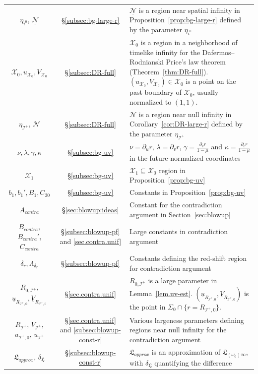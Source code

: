 \documentclass[10pt, reqno]{amsart}
\theoremstyle{definition}
\theoremstyle{remark}
\theoremstyle{conjecture}
\numberwithin{equation}{section}
\newcommand{\set}[1]{\{#1\}}
\newcommand{\rd}{\partial}
\newcommand{\0}{\emptyset}
\newcommand{\gmm}{\gamma}
\newcommand{\kpp}{\kappa}
\newcommand{\lmb}{\lambda}
\newcommand{\Sgm}{\Sigma}
\newcommand{\omg}{\omega}
\newcommand{\calI}{\mathcal I}
\newcommand{\calN}{\mathcal N}
\newcommand{\calX}{\mathcal X}
\newcommand{\dur}{\nu}
\newcommand{\dvr}{\lmb}
\newcommand{\de}{\delta}
\newcommand{\NI}{\calI^{+}}						%
\newcommand{\ub}{\underline{u}}
\newcommand{\Vb}{\underline{V}}
\begin{document}
\begin{center}
\begin{tabular}{c  c p{25em}}
$\eta_{i^{0}}$, $\underline{\calN}$ & \S \ref{subsec:bg-large-r} & $\underline{\calN}$ is a region near spatial infinity in Proposition~\ref{prop:bg-large-r} defined by the parameter $\eta_{i^{0}}$\\
$\calX_{0}, u_{\calX_{0}}, V_{\calX_{0}}$ & \S \ref{subsec:DR-full} & $\calX_{0}$ is a region in a neighborhood of timelike infinity for the Dafermos--Rodnianski Price's law theorem (Theorem~\ref{thm:DR-full}). $(u_{\calX_{0}}, V_{\calX_{0}}) \in \calX_{0}$ is a point on the past boundary of $\calX_{0}$, usually normalized to $(1, 1)$. \\
$\eta_{\NI}$, $\calN$ & \S \ref{subsec:DR-full} & $\calN$ is a region near null infinity in Corollary~\ref{cor:DR-large-r} defined by the parameter $\eta_{\NI}$\\
$\dur, \dvr, \gmm, \kpp$ & \S \ref{subsec:bg-uv} & $\dur = \rd_{u} r$, $\dvr = \rd_{v} r$, $\gmm = \frac{\rd_{v} r}{1-\mu}$ and $\kpp = \frac{\rd_{v} r}{1-\mu}$ in the future-normalized coordinates \\
$\calX_{1}$ & \S \ref{subsec:bg-uv} & $\calX_{1}\subseteq \calX_{0}$ region in Proposition~\ref{prop:bg-uv} \\
$b_{1}, b_{1}', B_{1}, C_{30}$ & \S \ref{subsec:bg-uv} & Constants in Proposition~\ref{prop:bg-uv} \\
$A_{contra}$ & \S \ref{sec:blowup:ideas} & Constant for the contradiction argument in Section~\ref{sec:blowup}\\
$B_{contra}$, $B_{contra}'$, $C_{contra}$ & \S \ref{subsec:blowup-pf} and \ref{sec.contra.unif} & Large constants in contradiction argument \\
$\de_r, \Lambda_{\de_r}$ & \S \ref{subsec:blowup-pf} & Constants defining the red-shift region for contradiction argument\\
$R_{0, \NI}$, $\ub_{R_{\NI, 0}}, \Vb_{R_{\NI, 0}}$ & \S \ref{sec.contra.unif} & $R_{0, \NI}$ is a large parameter in Lemma~\ref{lem.uv-est}. $(\ub_{R_{\NI, 0}}, \Vb_{R_{\NI, 0}})$ is the point in $\Sgm_{0} \cap \set{r = R_{\NI, 0}}$. \\
$R_{\NI}$, $V_{\NI}$, $u_{\NI, 0}$, $u_{\NI}$ & \S \ref{sec.contra.unif} and \ref{subsec:blowup-const-r} & Various largeness parameters defining regions near null infinity for the contradiction argument\\
$\mathfrak L_{approx}$, $\de_{\mathfrak L}$ & \S \ref{subsec:blowup-const-r} & $\mathfrak L_{approx}$ is an approximation of $\mathfrak L_{(\omg_0)\infty}$, with $\de_{\mathfrak L}$ quantifying the difference\\

\end{tabular}
\end{center}
\end{document}
